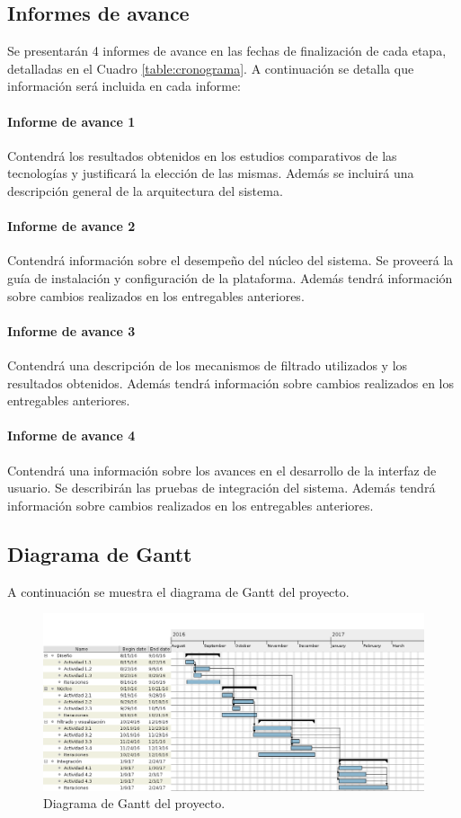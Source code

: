 \subsection*{Informes de avance}


Se presentarán 4 informes de avance en las fechas de finalización de cada etapa, detalladas en el Cuadro \ref{table:cronograma}. A continuación se detalla que información será incluida en cada informe:

\paragraph{Informe de avance 1} 
Contendrá los resultados obtenidos en los estudios comparativos de las tecnologías y justificará la elección de las mismas. Además se incluirá una descripción general de la arquitectura del sistema.

\paragraph{Informe de avance 2}
Contendrá información sobre el desempeño del núcleo del sistema. Se proveerá la guía de instalación y configuración de la plataforma. Además tendrá información sobre cambios realizados en los entregables anteriores.

\paragraph{Informe de avance 3}
Contendrá una descripción de los mecanismos de filtrado utilizados y los resultados obtenidos. Además tendrá información sobre cambios realizados en los entregables anteriores.

\paragraph{Informe de avance 4}
Contendrá una información sobre los avances en el desarrollo de la interfaz de usuario. Se describirán las pruebas de integración del sistema. Además tendrá información sobre cambios realizados en los entregables anteriores.

\newpage

\subsection*{Diagrama de Gantt}

A continuación se muestra el diagrama de Gantt del proyecto.

\begin{figure}[htbp!]
	\includegraphics[scale=.4]{gantt_png}
	\caption{Diagrama de Gantt del proyecto.}
	\label{fig:gantt}
\end{figure}